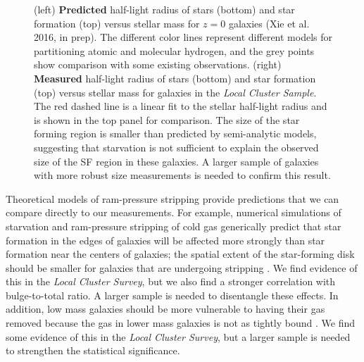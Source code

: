 \documentclass[12pt, preprint]{aastex}
\begin{document}
{\begin{figure}[h!]
\caption{ (left) {\bf Predicted} half-light radius
  of stars (bottom) and star formation (top) versus stellar mass for
  $z = 0 $ galaxies (Xie et al. 2016, in prep).
  The different color lines represent different models for partitioning
  atomic and molecular hydrogen, and the grey points show comparison
  with some existing observations.  
(right) {\bf Measured} half-light radius of stars (bottom) and star
formation (top) versus stellar mass for galaxies in the {\it Local Cluster Sample}.  The
red dashed line is a linear fit to the stellar half-light radius and
is shown in the top panel for comparison.  The size of the star
forming region is smaller than predicted by semi-analytic models,
suggesting that starvation is not sufficient to explain the observed
size of the SF region in these galaxies.  A larger sample of galaxies
with more robust size measurements is needed to confirm this result.}
\label{lizhi_comparison}
\end{figure}



Theoretical models of ram-pressure stripping provide predictions that
we can compare directly to our measurements.
For example, numerical simulations of starvation and ram-pressure stripping of cold gas 
generically predict that star formation in the edges
of galaxies will be affected more strongly than star formation near the
centers of galaxies; the spatial extent of the star-forming disk
should be smaller for galaxies that are undergoing stripping \citep[e.g.][]{kawata08, bekki14}.
We find evidence of this in the {\it Local Cluster Survey}, but we
also find a stronger correlation with bulge-to-total ratio.  A larger
sample is needed to disentangle these effects.
In addition, low mass galaxies should be more
vulnerable to having their gas removed 
because the gas in lower mass galaxies is not as tightly
bound \citep[e.g.][]{kawata08, mccarthy07, bekki14}.  We find
some evidence of this in the {\it Local Cluster Survey}, but a larger
sample is needed to strengthen the statistical significance. 

\vspace*{-1cm}
}
\end{document}
